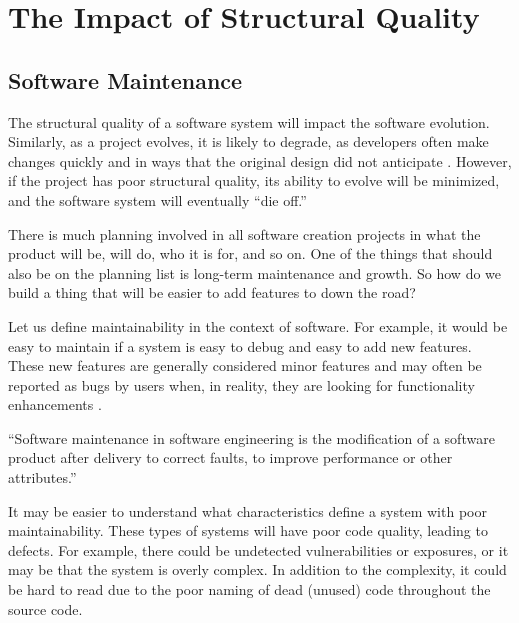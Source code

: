
\section{The Impact of Structural Quality} \label{sectionMyIdea}

\subsection{Software Maintenance} \label{subSoftwareMaintenance}

The structural quality of a software system will impact the software evolution. Similarly, as a project evolves, it is likely to degrade, as developers often make changes quickly and in ways that the original design did not anticipate \cite{martin:2000}. However, if the project has poor structural quality, its ability to evolve will be minimized, and the software system will eventually ``die off.''

There is much planning involved in all software creation projects in what the product will be, will do, who it is for, and so on. One of the things that should also be on the planning list is long-term maintenance and growth. So how do we build a thing that will be easier to add features to down the road?

Let us define maintainability in the context of software. For example, it would be easy to maintain if a system is easy to debug and easy to add new features. These new features are generally considered minor features and may often be reported as bugs by users when, in reality, they are looking for functionality enhancements \cite{wiki:software-maintenance}.

\vspace{0.25cm}
\begin{displayquote}
  ``Software maintenance in software engineering is the modification of a software product after delivery to correct faults, to improve performance or other attributes.'' \cite{wiki:software-maintenance}
\end{displayquote}
\vspace{0.25cm}

It may be easier to understand what characteristics define a system with poor maintainability. These types of systems will have poor code quality, leading to defects. For example, there could be undetected vulnerabilities or exposures, or it may be that the system is overly complex. In addition to the complexity, it could be hard to read due to the poor naming of dead (unused) code throughout the source code.

